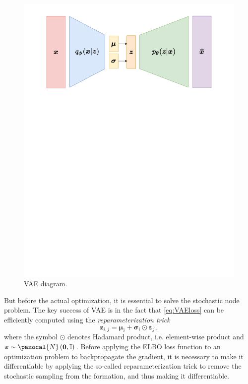  \begin{figure}[h]
	\centering
	\includegraphics[width=\textwidth, trim={0 18cm 0 0}]{plots/Images/VAE_diagram.pdf}
	\caption{VAE diagram.}%
	\label{fig:VAE_architecture}%
\end{figure}

But before the actual optimization, it is essential to solve the stochastic node problem.   The key success of VAE is in the fact that \eqref{eq:VAEloss} can be efficiently computed using the \emph{reparameterization trick}
\begin{equation}
\boldsymbol{z}_{i,j} = \boldsymbol{\mu}_i + \boldsymbol{\sigma}_i\odot\boldsymbol{\varepsilon}_j ,
\end{equation}
where the symbol $\odot$ denotes Hadamard product, i.e. element-wise product and $\boldsymbol{\varepsilon} \sim \pazocal{N}\left(\boldsymbol{0},\mathbb{I} \right)$. 
Before applying the ELBO loss function to an optimization problem to backpropagate the gradient, it is necessary to make it differentiable by applying the so-called reparameterization trick to remove the stochastic sampling from the formation, and thus making it differentiable. 



